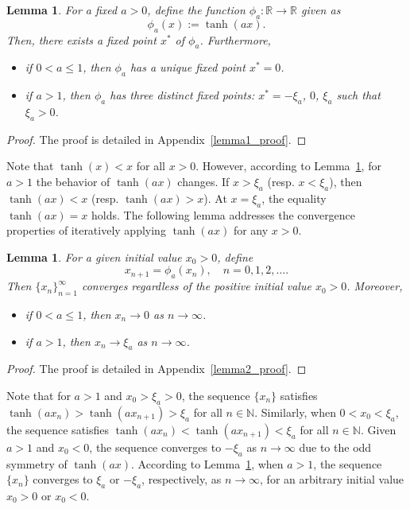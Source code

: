 \documentclass{article} \usepackage{iclr2025_conference,times}
\newtheorem{lemma}[theorem]{Lemma}
\begin{document}
\begin{lemma}\label{lemma:fixedpoint1}
For a fixed $a>0$, define the function $\phi_a: \mathbb{R} \to \mathbb{R}$ given as
\[
\phi_a(x) := \tanh(a x).
\]
Then, there exists a fixed point $x^\ast$ of $\phi_a$. Furthermore, 
\begin{itemize}
    \item[$(1)$] if $0 < a \leq 1$, then $\phi_a$ has a unique fixed point $x^{\ast} = 0$.
    \item[$(2)$] if $a > 1$, then $\phi_a$ has three distinct fixed points: $x^{\ast}=-\xi_a$, $0$, $\xi_a$ such that $
    \xi_a>0$.
\end{itemize}
\end{lemma}
\begin{proof}
The proof is detailed in Appendix~\ref{lemma1_proof}.
\end{proof}
Note that \( \tanh(x) < x \) for all \( x > 0 \). However, according to Lemma~\ref{lemma:fixedpoint1}, for $ a > 1 $ the behavior of \( \tanh(ax) \) changes. If \( x > \xi_a \) (resp. \( x < \xi_a \)), then \( \tanh(ax) < x \) (resp. \( \tanh(ax) > x \)).
At \( x = \xi_a \), the equality \( \tanh(ax) = x \) holds. The following lemma addresses the convergence properties of iteratively applying \( \tanh(ax) \) for any \( x > 0 \).



\begin{lemma}\label{lemma:fixedpoint2}
    For a given initial value $x_0>0$, define 
$$
x_{n+1} = \phi_a(x_n), \quad n = 0, 1, 2, \ldots.
$$
Then $\{x_n\}_{n=1}^{\infty}$ converges regardless of the positive initial value $x_0>0$.
Moreover,
\begin{itemize}
    \item[$(1)$] if $0 < a \leq 1$, then $x_n\to 0$ as $n\to \infty$.
    \item[$(2)$] if $a > 1$, then $x_n\to \xi_a$ as $n\to \infty$.
\end{itemize}
\end{lemma}
\begin{proof}
The proof is detailed in Appendix~\ref{lemma2_proof}.
\end{proof}
Note that for \( a > 1 \) and \( x_0 > \xi_a > 0 \), the sequence \( \{x_n\} \) satisfies \( \tanh(ax_n) > \tanh(ax_{n+1}) > \xi_a \) for all \( n \in \mathbb{N} \). Similarly, when \( 0 < x_0 < \xi_a \), the sequence satisfies \( \tanh(ax_n) < \tanh(ax_{n+1}) < \xi_a \) for all \( n \in \mathbb{N} \). Given \( a > 1 \) and \( x_0 < 0 \), the sequence converges to \( -\xi_a \) as \( n \to \infty \) due to the odd symmetry of \( \tanh(ax) \). According to Lemma~\ref{lemma:fixedpoint2}, when \( a > 1 \), the sequence \( \{x_n\} \) converges to \( \xi_a \) or \( -\xi_a \), respectively, as \( n \to \infty \), for an arbitrary initial value \( x_0 > 0 \) or \( x_0 < 0 \).
\end{document}
